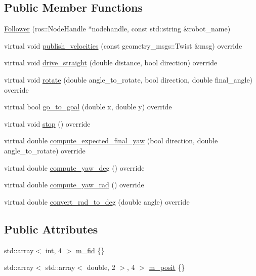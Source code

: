 \subsection*{Public Member Functions}
\begin{DoxyCompactItemize}
\item 
\hyperlink{class_follower_a6870e654b7cc901944ead12870a6b107}{Follower} (ros\+::\+Node\+Handle $\ast$nodehandle, const std\+::string \&robot\+\_\+name)
\item 
virtual void \hyperlink{class_follower_ae9e1df72904d2171d99f7bd18ccd89ab}{publish\+\_\+velocities} (const geometry\+\_\+msgs\+::\+Twist \&msg) override
\item 
virtual void \hyperlink{class_follower_a0af597b7d7f416c37d85be69377d0b58}{drive\+\_\+straight} (double distance, bool direction) override
\item 
virtual void \hyperlink{class_follower_ae241d3dc81b6ddebdfbede88e2cebb98}{rotate} (double angle\+\_\+to\+\_\+rotate, bool direction, double final\+\_\+angle) override
\item 
virtual bool \hyperlink{class_follower_ab4e7d953f54be23aadd7ed081d01ea2c}{go\+\_\+to\+\_\+goal} (double x, double y) override
\item 
virtual void \hyperlink{class_follower_a098544bd512f5d5b054e15d173cec066}{stop} () override
\item 
virtual double \hyperlink{class_follower_ab87e93b6fafa6f25137ba60d5860558e}{compute\+\_\+expected\+\_\+final\+\_\+yaw} (bool direction, double angle\+\_\+to\+\_\+rotate) override
\item 
virtual double \hyperlink{class_follower_a300c727aa90274ffa63a2fb9a6403054}{compute\+\_\+yaw\+\_\+deg} () override
\item 
virtual double \hyperlink{class_follower_a09782942c6aeb9c1797931eb42bc9d20}{compute\+\_\+yaw\+\_\+rad} () override
\item 
virtual double \hyperlink{class_follower_a8d6f37307eb0693f9ca04d31ccfe75ae}{convert\+\_\+rad\+\_\+to\+\_\+deg} (double angle) override
\end{DoxyCompactItemize}
\subsection*{Public Attributes}
\begin{DoxyCompactItemize}
\item 
std\+::array$<$ int, 4 $>$ \hyperlink{class_follower_a350054bbd7659d493cccc4b4ad9bc460}{m\+\_\+fid} \{\}
\item 
std\+::array$<$ std\+::array$<$ double, 2 $>$, 4 $>$ \hyperlink{class_follower_a6d4e1ebbe79cc8af601d53cba7aeb30a}{m\+\_\+posit} \{\}
\end{DoxyCompactItemize}
